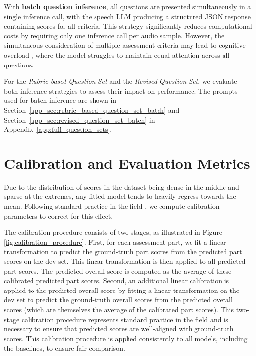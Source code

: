 \documentclass{report}
\begin{document}
With \textbf{batch question inference}, all questions are presented simultaneously in a single inference call, with the speech LLM producing a structured JSON response containing scores for all criteria. This strategy significantly reduces computational costs by requiring only one inference call per audio sample. However, the simultaneous consideration of multiple assessment criteria may lead to cognitive overload \citep{cheng2023batchpromptingefficientinference}, where the model struggles to maintain equal attention across all questions.

For the \emph{Rubric-based Question Set} and the \emph{Revised Question Set}, we evaluate both inference strategies to assess their impact on performance. The prompts used for batch inference are shown in Section~\ref{app_sec:rubric_based_question_set_batch} and Section~\ref{app_sec:revised_question_set_batch} in Appendix~\ref{app:full_question_sets}.

\section{Calibration and Evaluation Metrics}
\label{chap:calibration_and_evaluation_metrics}
Due to the distribution of scores in the dataset being dense in the middle and sparse at the extremes, any fitted model tends to heavily regress towards the mean. Following standard practice in the field \citep{qian2024sandi,ma2025assessment}, we compute calibration parameters to correct for this effect.

The calibration procedure consists of two stages, as illustrated in Figure \ref{fig:calibration_procedure}. First, for each assessment part, we fit a linear transformation to predict the ground-truth part scores from the predicted part scores on the dev set. This linear transformation is then applied to all predicted part scores. The predicted overall score is computed as the average of these calibrated predicted part scores. Second, an additional linear calibration is applied to the predicted overall score by fitting a linear transformation on the dev set to predict the ground-truth overall scores from the predicted overall scores (which are themselves the average of the calibrated part scores). This two-stage calibration procedure represents standard practice in the field \citep{qian2024sandi, ma2025assessment} and is necessary to ensure that predicted scores are well-aligned with ground-truth scores. This calibration procedure is applied consistently to all models, including the baselines, to ensure fair comparison.
\end{document}
